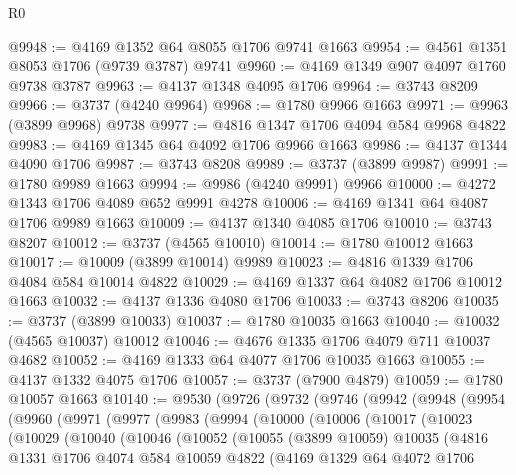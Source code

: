 \begin{lexlean}{R0}
\begin{coremodule}
@9948 := @4169 @1352 @64 @8055 @1706 @9741 @1663
@9954 := @4561 @1351 @8053 @1706 (@9739 @3787) @9741
@9960 := @4169 @1349 @907 @4097 @1760 @9738 @3787
@9963 := @4137 @1348 @4095 @1706
@9964 := @3743 @8209
@9966 := @3737 (@4240 @9964)
@9968 := @1780 @9966 @1663
@9971 := @9963 (@3899 @9968) @9738
@9977 := @4816 @1347 @1706 @4094 @584 @9968 @4822
@9983 := @4169 @1345 @64 @4092 @1706 @9966 @1663
@9986 := @4137 @1344 @4090 @1706
@9987 := @3743 @8208
@9989 := @3737 (@3899 @9987)
@9991 := @1780 @9989 @1663
@9994 := @9986 (@4240 @9991) @9966
@10000 := @4272 @1343 @1706 @4089 @652 @9991 @4278
@10006 := @4169 @1341 @64 @4087 @1706 @9989 @1663
@10009 := @4137 @1340 @4085 @1706
@10010 := @3743 @8207
@10012 := @3737 (@4565 @10010)
@10014 := @1780 @10012 @1663
@10017 := @10009 (@3899 @10014) @9989
@10023 := @4816 @1339 @1706 @4084 @584 @10014 @4822
@10029 := @4169 @1337 @64 @4082 @1706 @10012 @1663
@10032 := @4137 @1336 @4080 @1706
@10033 := @3743 @8206
@10035 := @3737 (@3899 @10033)
@10037 := @1780 @10035 @1663
@10040 := @10032 (@4565 @10037) @10012
@10046 := @4676 @1335 @1706 @4079 @711 @10037 @4682
@10052 := @4169 @1333 @64 @4077 @1706 @10035 @1663
@10055 := @4137 @1332 @4075 @1706
@10057 := @3737 (@7900 @4879)
@10059 := @1780 @10057 @1663
@10140 := @9530
    (@9726
      (@9732
        (@9746
          (@9942
            (@9948
              (@9954
                (@9960
                  (@9971
                    (@9977
                      (@9983
                        (@9994
                          (@10000
                            (@10006
                              (@10017
                                (@10023
                                  (@10029
                                    (@10040
                                      (@10046
                                        (@10052
                                          (@10055
                                            (@3899 @10059)
                                            @10035
                                            (@4816
                                              @1331
                                              @1706
                                              @4074
                                              @584
                                              @10059
                                              @4822
                                              (@4169
                                                @1329
                                                @64
                                                @4072
                                                @1706

\end{coremodule}
\end{lexlean}
